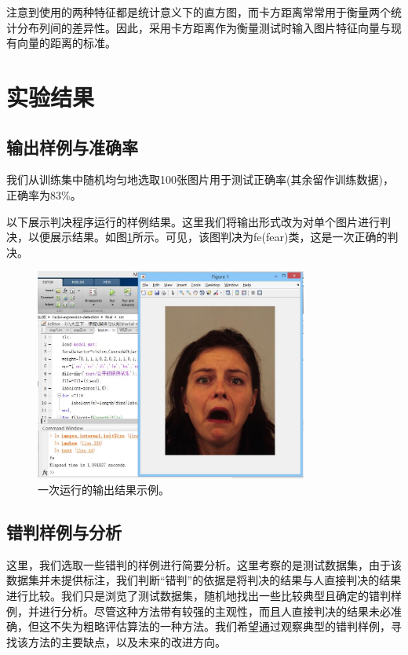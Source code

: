\documentclass[UTF8]{ctexart}
\begin{document}
注意到使用的两种特征都是统计意义下的直方图，而卡方距离常常用于衡量两个统计分布列间的差异性。因此，采用卡方距离作为衡量测试时输入图片特征向量与现有向量的距离的标准。

\section{实验结果}

\subsection{输出样例与准确率}

我们从训练集中随机均匀地选取100张图片用于测试正确率(其余留作训练数据)，正确率为83\%。

以下展示判决程序运行的样例结果。这里我们将输出形式改为对单个图片进行判决，以便展示结果。如图\ref{fig:result}所示。可见，该图判决为fe(fear)类，这是一次正确的判决。
\begin{figure}[ht]
  \centering
  \includegraphics[width=0.8\textwidth]{result.jpg}
  \caption{一次运行的输出结果示例。}\label{fig:result}
\end{figure}

\subsection{错判样例与分析}

这里，我们选取一些错判的样例进行简要分析。这里考察的是测试数据集，由于该数据集并未提供标注，我们判断“错判”的依据是将判决的结果与人直接判决的结果进行比较。我们只是浏览了测试数据集，随机地找出一些比较典型且确定的错判样例，并进行分析。尽管这种方法带有较强的主观性，而且人直接判决的结果未必准确，但这不失为粗略评估算法的一种方法。我们希望通过观察典型的错判样例，寻找该方法的主要缺点，以及未来的改进方向。
\end{document}

